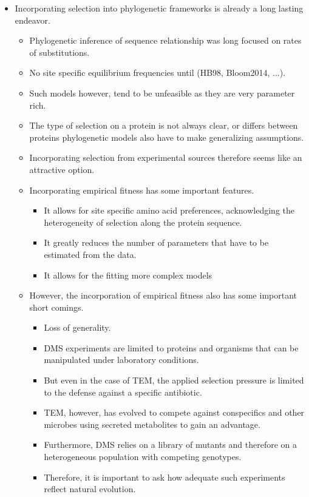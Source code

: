 \documentclass[12pt]{article}
\begin{document}
\begin{itemize}
	\item Incorporating selection into phylogenetic frameworks is already a long lasting endeavor.
	\begin{itemize}
		\item Phylogenetic inference of sequence relationship was long focused on rates of substitutions.
		\item No site specific equilibrium frequencies until (HB98, Bloom2014, ...).
		\item Such models however, tend to be unfeasible as they are very parameter rich.
		\item The type of selection on a protein is not always clear, or differs between proteins phylogenetic models also have to make generalizing assumptions.
		\item Incorporating selection from experimental sources therefore seems like an attractive option.
		\item Incorporating empirical fitness has some important features.
		\begin{itemize}
			\item It allows for site specific amino acid preferences, acknowledging the heterogeneity of selection along the protein sequence.
			\item It greatly reduces the number of parameters that have to be estimated from the data.
			\item It allows for the fitting more complex models
		\end{itemize}
		\item However, the incorporation of empirical fitness also has some important short comings.
		\begin{itemize}
			\item Loss of generality.
			\item DMS experiments are limited to proteins and organisms that can be manipulated under laboratory conditions.
			\item But even in the case of TEM, the applied selection pressure is limited to the defense against a specific antibiotic.
			\item TEM, however, has evolved to compete against conspecifics and other microbes using secreted metabolites to gain an advantage.
			\item Furthermore, DMS relies on a library of mutants and therefore on a heterogeneous population with competing genotypes.
			\item Therefore, it is important to ask how adequate such experiments reflect natural evolution. 

\end{itemize}
\end{itemize}
\end{itemize}
\end{document}
